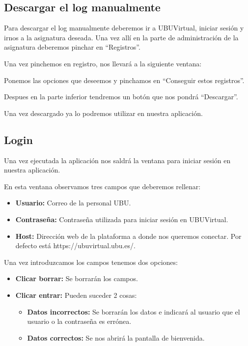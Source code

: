 
\subsection{Descargar el log manualmente}

Para descargar el log manualmente deberemos ir a UBUVirtual, iniciar sesión y irnos a la asignatura deseada. Una vez allí en la parte de administración de la asignatura deberemos pinchar en ``Registros''.


Una vez pinchemos en registro, nos llevará a la siguiente ventana:


Ponemos las opciones que deseemos y pinchamos en ``Conseguir estos registros''.


Despues en la parte inferior tendremos un botón que nos pondrá ``Descargar''.


Una vez descargado ya lo podremos utilizar en nuestra aplicación.


\subsection{Login}


Una vez ejecutada la aplicación nos saldrá la ventana para iniciar sesión en nuestra aplicación.


En esta ventana observamos tres campos que deberemos rellenar:

\begin{itemize}
	\tightlist
	\item
	\textbf{Usuario:} Correo de la personal UBU.
	\item
	\textbf{Contraseña:} Contraseña utilizada para iniciar sesión en UBUVirtual.
	\item
	\textbf{Host:} Dirección web de la plataforma a donde nos queremos conectar. Por defecto está https://ubuvirtual.ubu.es/.
\end{itemize}

Una vez introduzcamos los campos tenemos dos opciones:

\begin{itemize}
	\tightlist
	\item
	\textbf{Clicar borrar:} Se borrarán los campos.
	\item
	\textbf{Clicar entrar:} Pueden suceder 2 cosas:
	\begin{itemize}
		\tightlist
		\item
		\textbf{Datos incorrectos:} Se borrarán los datos e indicará al usuario que el usuario o la contraseña es errónea.
		\item
		\textbf{Datos correctos:} Se nos abrirá la pantalla de bienvenida.
	\end{itemize}
\end{itemize}

